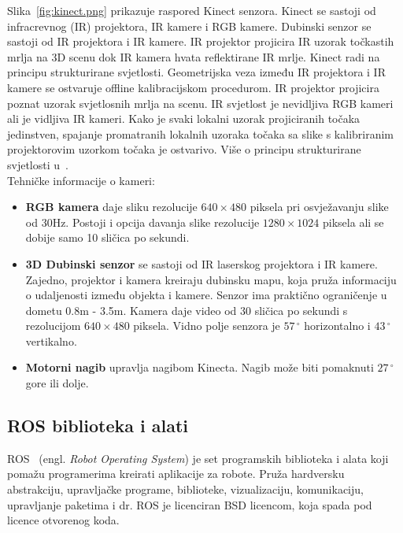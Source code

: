 Slika~\ref{fig:kinect.png} prikazuje raspored Kinect senzora. Kinect se
sastoji od infracrevnog (IR) projektora, IR kamere i RGB kamere.
Dubinski senzor se sastoji od IR projektora i IR kamere. IR projektor
projicira IR uzorak točkastih mrlja na 3D scenu dok IR kamera hvata
reflektirane IR mrlje. Kinect radi na principu strukturirane svjetlosti.
Geometrijska veza između IR projektora i IR kamere se ostvaruje offline
kalibracijskom procedurom. IR projektor projicira poznat uzorak
svjetlosnih mrlja na scenu. IR svjetlost je nevidljiva RGB kameri ali
je vidljiva IR kameri. Kako je svaki lokalni uzorak projiciranih točaka
jedinstven, spajanje promatranih lokalnih uzoraka točaka sa slike
s kalibriranim projektorovim uzorkom točaka je ostvarivo. Više o
principu strukturirane svjetlosti u~\cite{structured:light}.\\

\newpage
Tehničke informacije o kameri:
\begin{itemize}
    \item \textbf{RGB kamera} daje sliku rezolucije \(640\times480\)
        piksela pri osvježavanju slike od 30Hz. Postoji i opcija davanja
        slike rezolucije \(1280 \times 1024\) piksela ali se dobije samo 10
        sličica po sekundi.
    \item \textbf{3D Dubinski senzor} se sastoji od IR laserskog
        projektora i IR kamere. Zajedno, projektor i kamera kreiraju
        dubinsku mapu, koja pruža informaciju o udaljenosti između
        objekta i kamere. Senzor ima praktično ograničenje u dometu 
        0.8m - 3.5m. Kamera daje video od 30 sličica po sekundi s
        rezolucijom \(640 \times 480\) piksela. Vidno polje senzora je
        \(57\,^{\circ}\) horizontalno i \(43\,^{\circ}\) vertikalno.
    \item \textbf{Motorni nagib} upravlja nagibom Kinecta. Nagib može
        biti pomaknuti \(27\,^{\circ}\) gore ili dolje.
\end{itemize}



\newpage
\subsection{ROS biblioteka i alati} %
\label{sub:ROS biblioteka i alati}

ROS~\cite{ros} (engl. \textit{Robot Operating System}) je set programskih
biblioteka i alata koji pomažu programerima kreirati aplikacije za
robote. Pruža hardversku abstrakciju, upravljačke programe, biblioteke,
vizualizaciju, komunikaciju, upravljanje paketima i dr. ROS je
licenciran BSD licencom, koja spada pod licence otvorenog koda.

